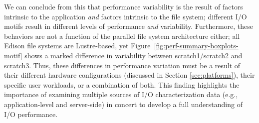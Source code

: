 We can conclude from this that performance variability is the result of factors intrinsic to the application \emph{and} factors intrinsic to the file system;
different I/O motifs result in different levels of performance \emph{and} variability.
Furthermore, these behaviors are not a function of the parallel file system architecture either; all Edison file systems are Lustre-based, yet Figure~\ref{fig:perf-summary-boxplots-motif} shows a marked difference in variability between scratch1/scratch2 and scratch3.
Thus, these differences in performance variation must be a result of their different hardware configurations (discussed in Section \ref{sec:platforms}), their specific user workloads, or a combination of both.
This finding highlights the importance of examining multiple sources of I/O characterization data (e.g., application-level and server-side) in concert to develop a full understanding of I/O performance.




